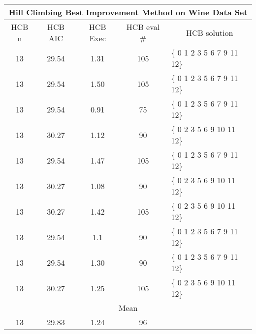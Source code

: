 \begin{tabular}{|c|c|c|c|l|}
	\hline
	\multicolumn{5}{|c|}{Hill Climbing Best Improvement Method on Wine Data Set}                          \\ \hline
	HCB n & HCB AIC     & HCB Exec & HCB eval \# & \multicolumn{1}{c|}{HCB solution} \\ \hline
	13    & 29.54 & 1.31              & 105                    & \{ 0 1 2 3 5 6 7 9 11 12\}        \\ \hline
	13    & 29.54 & 1.50              & 105                    & \{ 0 1 2 3 5 6 7 9 11 12\}        \\ \hline
	13    & 29.54 & 0.91              & 75                     & \{ 0 1 2 3 5 6 7 9 11 12\}        \\ \hline
	13    & 30.27 & 1.12              & 90                     & \{ 0 2 3 5 6 9 10 11 12\}         \\ \hline
	13    & 29.54 & 1.47              & 105                    & \{ 0 1 2 3 5 6 7 9 11 12\}        \\ \hline
	13    & 30.27 & 1.08              & 90                     & \{ 0 2 3 5 6 9 10 11 12\}         \\ \hline
	13    & 30.27 & 1.42              & 105                    & \{ 0 2 3 5 6 9 10 11 12\}         \\ \hline
	13    & 29.54 & 1.1                & 90                     & \{ 0 1 2 3 5 6 7 9 11 12\}        \\ \hline
	13    & 29.54 & 1.30              & 90                     & \{ 0 1 2 3 5 6 7 9 11 12\}        \\ \hline
	13    & 30.27 & 1.25              & 105                    & \{ 0 2 3 5 6 9 10 11 12\}         \\ \hline
	\multicolumn{5}{|c|}{Mean}                                                                            \\ \hline
	13    & 29.83 & 1.24             & 96                     &                                   \\ \hline
\end{tabular}


